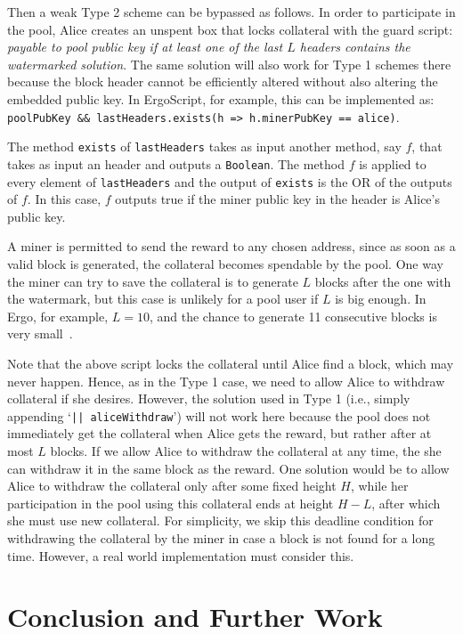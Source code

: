 \documentclass{llncs}
\newcommand{\langname}{ErgoScript\xspace}
\begin{document}
Then a weak Type 2 scheme can be bypassed as follows. In order to participate in the pool, Alice creates an unspent box that locks collateral with the guard script: {\em payable to pool public key if at least one of the last $L$ headers contains the watermarked solution}. The same solution will also work for Type 1 schemes there because the block header cannot be efficiently altered without also altering the embedded public key. In \langname, for example, this can be implemented as: \texttt{poolPubKey \&\& lastHeaders.exists(h => h.minerPubKey == alice)}.

The method \texttt{exists} of \texttt{lastHeaders} takes as input another method, say $f$, that takes as input an header and outputs a \texttt{Boolean}. The method $f$ is applied to every element of \texttt{lastHeaders} and the output of \texttt{exists} is the OR of the outputs of $f$. In this case, $f$ outputs true if the miner public key in the header is Alice's public key. 


A miner is permitted to send the reward to any chosen address, since as soon as a valid block is generated, the collateral becomes spendable by the pool. One way the miner can try to save the collateral is to generate $L$ blocks after the one with the watermark, but this case is unlikely for a pool user if $L$ is big enough. In Ergo, for example, $L = 10$, and the chance to generate 11 consecutive blocks is very small~\cite{Nak08}. 

Note that the above script locks the collateral until Alice find a block, which may never happen. Hence, as in the Type 1 case, we need to allow Alice to withdraw collateral if she desires. However, the solution used in Type 1 (i.e., simply appending `\texttt{|| aliceWithdraw}') will not work here because the pool does not immediately get the collateral when Alice gets the reward, but rather after at most $L$ blocks. If we allow Alice to withdraw the collateral at any time, the she can withdraw it in the same block as the reward.
One solution would be to allow Alice to withdraw the collateral only after some fixed height $H$, while her participation in the pool using this collateral ends at height $H - L$, after which she must use new collateral. For simplicity, we skip this deadline condition for withdrawing the collateral by the miner in case a block is not found for a long time. However, a real world implementation must consider this.

\section{Conclusion and Further Work}
\label{conclusion}
\end{document}
